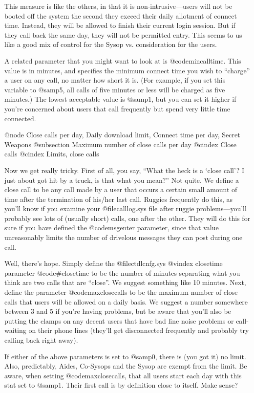 This measure is like the others, in that it is non-intrusive---users
will not be booted off the system the second they
exceed their daily allotment of connect time.  Instead, they
will be allowed to finish their current login session.  But
if they call back the same day, they will not be permitted entry.
This seems to us like a good mix of control for the Sysop vs.
consideration for the users.

A related parameter that you might want to look at is
@code{mincalltime}.  This value is in minutes, and specifies the
minimum connect time you wish to ``charge'' a user on any call,
no matter how short it is.  (For example, if you set this variable to
@samp{5}, all calls of five minutes or less will be charged as five minutes.)
The lowest acceptable value is @samp{1},
but you can set it higher if you're concerned about users that
call frequently but spend very little time connected.

@node Close calls per day, Daily download limit, Connect time per day, Secret Weapons
@subsection Maximum number of close calls per day
@cindex Close calls
@cindex Limits, close calls

Now we get really tricky.  First of all, you say,
``What the heck is a `close call'?  I just about got hit by
a truck, is that what you mean?''  Not quite.  We define a close
call to be any call made by a user that occurs a certain small
amount of time after the termination of his/her last call.
Ruggies frequently do this, as you'll know if you examine your
@file{calllog.sys} file after ruggie problems---you'll probably see
lots of (usually short) calls, one after the other.  They will
do this for sure if you have defined the @code{msgenter} parameter,
since that value unreasonably limits the number of drivelous
messages they can post during one call.

Well, there's hope.  Simply define the @file{ctdlcnfg.sys}
@vindex closetime
parameter @code{#closetime} to be the number of minutes separating
what you think are two calls that are ``close''.  We suggest
something like 10 minutes.  Next, define the parameter
@code{maxclosecalls} to be the maximum number of close calls that
users will be allowed on a daily basis.  We suggest a number
somewhere between 3 and 5 if you're having problems, but be
aware that you'll also be putting the clamps on any decent
users that have bad line noise problems or call-waiting on
their phone lines (they'll get disconnected frequently and
probably try calling back right away).

If either of the above parameters is set to @samp{0}, there is
(you got it) no limit.  Also, predictably, Aides, Co-Sysops and the Sysop
are exempt from the limit.  Be aware, when setting @code{maxclosecalls},
that all users start each day with this stat set to @samp{1}.  Their
first call is by definition close to itself.  Make sense?

